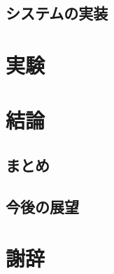 \documentclass{funthesis}
\begin{document}
\section{システムの実装}

\chapter{実験}

\chapter{結論}

\section{まとめ}

\section{今後の展望}

\chapter *{謝辞}



\begin{thebibliography}{7}
\end{thebibliography}

\listoftables

\listoffigures
\end{document}
